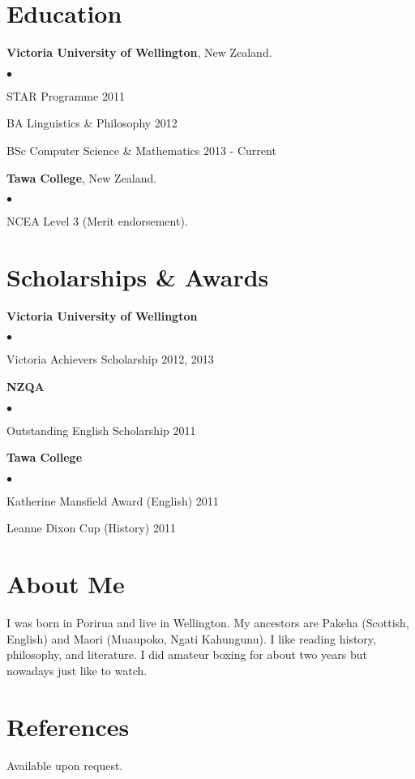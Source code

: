 \documentclass[margin,line]{res}
\newenvironment{list2}{
  \begin{list}{$\bullet$}{%
      \setlength{\itemsep}{0in}
      \setlength{\parsep}{0in} \setlength{\parskip}{0in}
      \setlength{\topsep}{0in} \setlength{\partopsep}{0in}
      \setlength{\leftmargin}{0.2in}}}{\end{list}}
\begin{document}
\begin{resume}
\section{\sc Education}
{\bf Victoria University of Wellington}, New Zealand.
\begin{list2}
	\item STAR Programme \hfill 2011
	\item BA Linguistics \& Philosophy \hfill 2012
	\item BSc Computer Science \& Mathematics \hfill 2013 - Current
\end{list2}

{\bf Tawa College}, New Zealand.
\begin{list2}
	\item NCEA Level 3 (Merit endorsement).
\end{list2}

\section{\sc Scholarships \& Awards}

{\bf Victoria University of Wellington}
\begin{list2}
	\item Victoria Achievers Scholarship \hfill 2012, 2013
\end{list2}

{\bf NZQA}
\begin{list2}
	\item Outstanding English Scholarship \hfill 2011
\end{list2}

{\bf Tawa College}
\begin{list2}
	\item Katherine Mansfield Award (English) \hfill 2011
	\item Leanne Dixon Cup (History) \hfill 2011
\end{list2}

\section{\sc About Me}
I was born in Porirua and live in Wellington. My ancestors are Pakeha (Scottish, English) and Maori (Muaupoko, Ngati Kahungunu). I like reading history, philosophy, and literature. I did amateur boxing for about two years but nowadays just like to watch.

\section{\sc References }
Available upon request.

\end{resume}
\end{document}
